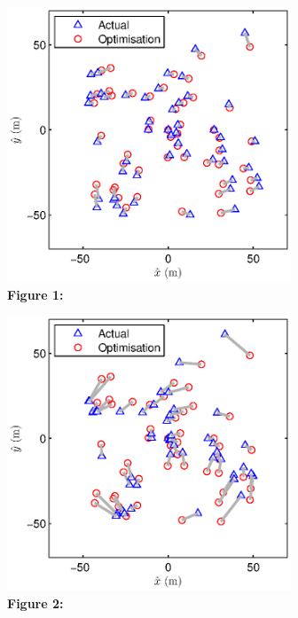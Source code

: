 \documentclass[12pt,double]{article}
\begin{document}
\clearpage

\noindent\includegraphics[width = 20pc]{Figure1_c.eps} \\
\textbf{Figure 1:} 


\clearpage
\noindent\includegraphics[width = 20pc]{Figure2_c.eps} \\
\textbf{Figure 2:} 
\end{document}
